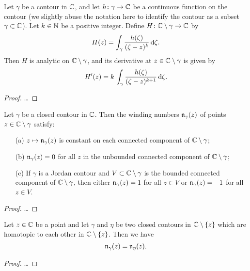 \begin{lemma}
  \label{lem:derivative_auxiliary_integral}
  Let $\gamma$ be a contour in $\mathbb{C}$, and let $h \colon \gamma \to \mathbb{C}$
  be a continuous function on the contour (we slightly abuse the notation
  here to identify the contour as a subset $\gamma \subset \mathbb{C}$).
  Let $k \in \mathbb{N}$ be a positive integer.
  Define $H \colon \mathbb{C} \setminus \gamma \to \mathbb{C}$ by
  \begin{align*}
    H(z) = \int_\gamma \frac{h(\zeta)}{(\zeta - z)^{k}} \, \mathrm{d} \zeta .
  \end{align*}
  Then $H$ is analytic on $\mathbb{C} \setminus \gamma$, and its derivative
  at $z \in \mathbb{C} \setminus \gamma$ is given by
  \begin{align*}
    H'(z) = k \, \int_\gamma \frac{h(\zeta)}{(\zeta - z)^{k+1}} \, \mathrm{d} \zeta .
  \end{align*}
\end{lemma}
\begin{proof}
  \ldots
\end{proof}

\begin{lemma}
  \label{lem:winding_number_properties}
  Let $\gamma$ be a closed contour in $\mathbb{C}$. Then the winding
  numbers $\mathfrak{n}_{{\gamma}}(z)$ of points $z \in \mathbb{C} \setminus \gamma$
  satisfy:
  \begin{itemize}
    \item[(a)] $z \mapsto \mathfrak{n}_{{\gamma}}(z)$ is constant on
      each connected component of $\mathbb{C} \setminus \gamma$;
    \item[(b)] $\mathfrak{n}_{{\gamma}}(z) = 0$ for all $z$ in the
      unbounded connected component of $\mathbb{C} \setminus \gamma$;
    \item[(c)] If $\gamma$ is a Jordan contour and
      $V \subset \mathbb{C} \setminus \gamma$ is the bounded connected
      component of $\mathbb{C} \setminus \gamma$, then
      either $\mathfrak{n}_{{\gamma}}(z) = 1$ for all $z \in V$
      or $\mathfrak{n}_{{\gamma}}(z) = -1$ for all $z \in V$.
  \end{itemize}
\end{lemma}
\begin{proof}
  \ldots
\end{proof}

\begin{lemma}
  \label{lem:winding_homotopy_invariance}
  Let $z \in \mathbb{C}$ be a point and let $\gamma$ and $\eta$ be two
  closed contours in $\mathbb{C} \setminus \left\{ z \right\}$ which are homotopic
  to each other in $\mathbb{C} \setminus \left\{ z \right\}$. Then we have
  \begin{align*}
    \mathfrak{n}_{{\gamma}}(z) = \mathfrak{n}_{{\eta}}(z) .
  \end{align*}
\end{lemma}
\begin{proof}
  \ldots
\end{proof}

